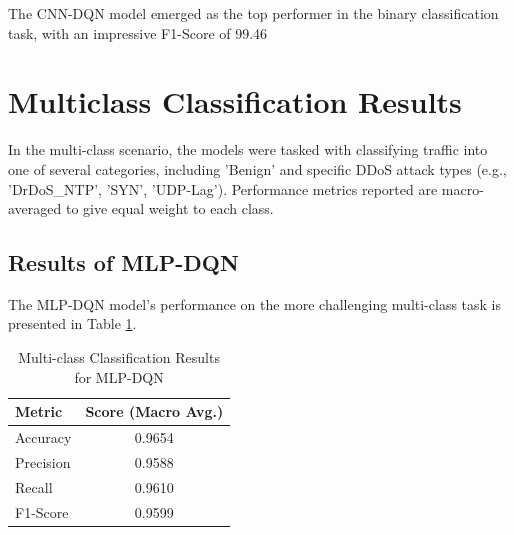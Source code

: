 \documentclass[16pt]{report}
\begin{document}
The CNN-DQN model emerged as the top performer in the binary classification task, with an impressive F1-Score of 99.46%

\newpage


\section{Multiclass Classification Results}
In the multi-class scenario, the models were tasked with classifying traffic into one of several categories, including 'Benign' and specific DDoS attack types (e.g., 'DrDoS\_NTP', 'SYN', 'UDP-Lag'). Performance metrics reported are macro-averaged to give equal weight to each class.

\subsection{Results of MLP-DQN}
The MLP-DQN model's performance on the more challenging multi-class task is presented in Table \ref{tab:multi_dqn_results}.

\begin{table}[H]
    \centering
    \caption{Multi-class Classification Results for MLP-DQN}
    \label{tab:multi_dqn_results}
    \begin{tabular}{@{}lc@{}}
        \toprule
        \textbf{Metric} & \textbf{Score (Macro Avg.)} \\
        \midrule
        Accuracy & 0.9654 \\
        Precision & 0.9588 \\
        Recall & 0.9610 \\
        F1-Score & 0.9599 \\
        \bottomrule
    \end{tabular}
\end{table}
\end{document}
